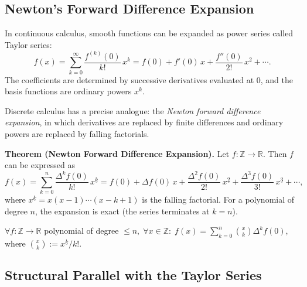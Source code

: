 
\subsection{Newton's Forward Difference Expansion}
\label{sec:newtons-expansion}

\begin{exposition}
In continuous calculus, smooth functions can be expanded as power series
called Taylor series:
\[
f(x)
=
\sum_{k=0}^{\infty} \frac{f^{(k)}(0)}{k!}\, x^k
=
f(0) + f'(0)\,x + \frac{f''(0)}{2!}\,x^2 + \cdots.
\]
The coefficients are determined by successive derivatives evaluated at \(0\),
and the basis functions are ordinary powers \(x^k\).

Discrete calculus has a precise analogue: the \emph{Newton forward difference
expansion}, in which derivatives are replaced by finite differences and
ordinary powers are replaced by falling factorials.
\end{exposition}

\begin{remark*}[Exposition]
\textbf{Theorem (Newton Forward Difference Expansion).}
Let \(f : \mathbb{Z} \to \mathbb{R}\). Then \(f\) can be expressed as
\[
f(x)
=
\sum_{k=0}^{n} \frac{\Delta^k f(0)}{k!}\, x^{\underline{k}}
=
f(0)
+
\Delta f(0)\, x
+
\frac{\Delta^2 f(0)}{2!}\, x^{\underline{2}}
+
\frac{\Delta^3 f(0)}{3!}\, x^{\underline{3}}
+
\cdots,
\]
where \(x^{\underline{k}} = x(x-1)\cdots(x-k+1)\) is the falling factorial.
For a polynomial of degree \(n\), the expansion is exact (the series
terminates at \(k = n\)).
\end{remark*}
\label{thm:newton-expansion}

\begin{remark*}
\(\forall f : \mathbb{Z}\to\mathbb{R}\) polynomial of degree \(\le n,\;
\forall x \in \mathbb{Z}:\;
f(x) = \displaystyle\sum_{k=0}^{n}\binom{x}{k}\Delta^k f(0)\),
where \(\binom{x}{k} := x^{\underline{k}}/k!\).
\end{remark*}

\subsection*{Structural Parallel with the Taylor Series}

